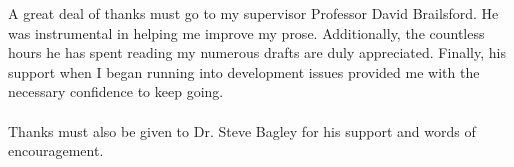 A great deal of thanks must go to my supervisor Professor David Brailsford. He was instrumental in helping me improve my prose. Additionally, the countless hours he has spent reading my numerous drafts are duly appreciated. Finally, his support when I began running into development issues provided me with the necessary confidence to keep going.\\\\
%
Thanks must also be given to Dr. Steve Bagley for his support and words of encouragement.
